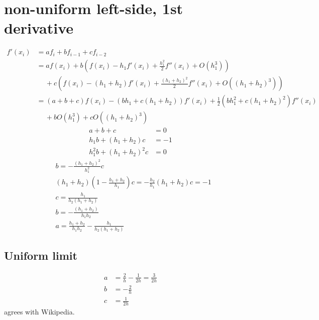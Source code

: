 \documentclass{article}
\begin{document}
\section{non-uniform left-side, 1st derivative}
\begin{align}
    f'\left( x_i \right) &= af_{i} + bf_{i-1} + cf_{i-2}
    \\
    &= af\left( x_i \right) + b\left( f\left( x_i \right) - h_{1}f'\left( x_i \right) + \frac{h_{1}^2}{2}f''\left( x_i \right) + O\left( h_{1}^3 \right)\right)
    \\ \nonumber
    &\quad\ + c\left( f\left( x_{i} \right) - \left( h_{1} + h_{2} \right)f'\left( x_i \right) + \frac{{\left( h_{1} + h_{2} \right)}^2}{2}f''\left( x_i \right) + O\left( {\left( h_{1} + h_{2} \right)}^3 \right)\right)
    \\
    &= \left( a + b + c \right)f\left( x_i \right)
    - \left( bh_{1} + c\left( h_1 + h_2 \right) \right)f'\left( x_i \right)
    + \frac{1}{2}\left( bh_{1}^{2} + c{\left(h_{1} + h_2\right)}^2 \right)f''\left( x_i \right)
    \\ \nonumber
    &\quad\ + bO\left( h_1^3 \right) + cO\left( {\left( h_1 + h_2 \right)}^3 \right)
    \label{}
\end{align}
\begin{align}
    a + b + c &= 0
    \\
    h_{1}b + \left( h_1 + h_{2} \right)c &= -1
    \\
    h_{1}^{2}b + {\left( h_1 + h_2 \right)}^2c &= 0
\end{align}
\begin{align}
    &b = -\frac{{\left(h_{1} + h_2\right)}^2}{h_{1}^2}c
    \\
    &\left( h_1 + h_2 \right)\left( 1 - \frac{h_1 + h_2}{h_1} \right)c = -\frac{h_2}{h_1}\left( h_1 + h_2 \right)c = -1
    \\
    &c = \frac{h_1}{h_{2}\left( h_1 + h_2 \right)}
    \\
    &b = -\frac{\left( h_1 + h_2 \right)}{h_1h_2}
    \\
    &a = \frac{h_1+h_2}{h_1h_2} - \frac{h_1}{h_2\left( h_1+h_2 \right)}
    \label{}
\end{align}
\subsection{Uniform limit}
\begin{align}
    a &= \frac{2}{h} - \frac{1}{2h} = \frac{3}{2h}
    \\
    b &= -\frac{2}{h}
    \\
    c &= \frac{1}{2h}
    \label{}
\end{align}
agrees with Wikipedia.
\end{document}
